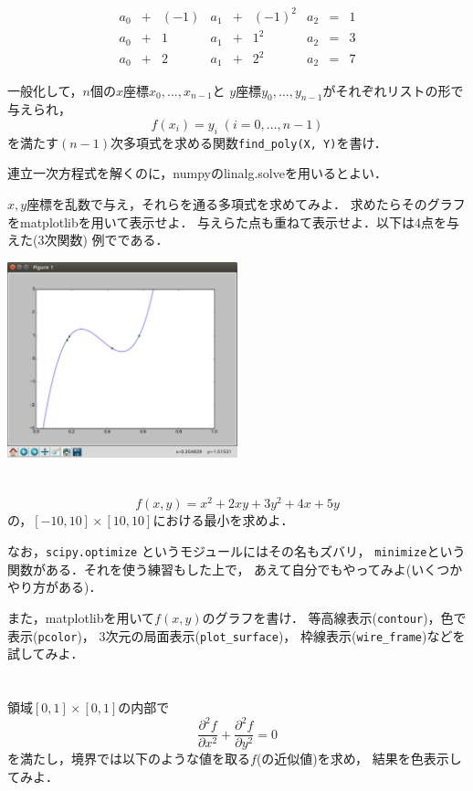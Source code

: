 \documentclass[12pt,dvipdfmx]{article}
\begin{document}
\[
\begin{array}{ccccccccc}
a_0 & + & (-1) & a_1 & + & (-1)^2 & a_2 & = & 1 \\
a_0 & + &   1  & a_1 & + & 1^2    & a_2 & = & 3 \\
a_0 & + &   2  & a_1 & + & 2^2    & a_2 & = & 7
\end{array}
\]

一般化して，$n$個の$x$座標$x_0, \ldots , x_{n-1}$と
$y$座標$y_0, \ldots , y_{n-1}$がそれぞれリストの形で与えられ，
\[ f(x_i) = y_i \; (i = 0, \ldots , n - 1) \]
を満たす$(n-1)$次多項式を求める関数{\tt find\_poly(X, Y)}を書け．

連立一次方程式を解くのに，numpyのlinalg.solveを用いるとよい．

$x, y$座標を乱数で与え，それらを通る多項式を求めてみよ．
求めたらそのグラフをmatplotlibを用いて表示せよ．
与えらた点も重ねて表示せよ．以下は4点を与えた(3次関数)
例でである．

\begin{center}
\includegraphics[width=0.5\textwidth]{out/pdf/img/poly.pdf}
\end{center}

\newpage
\fi



\section{}
\[ f(x,y) = x^2 + 2xy + 3y^2 + 4x + 5y \]
の，$[-10,10] \times [10,10]$における最小を求めよ．

なお，{\tt scipy.optimize} というモジュールにはその名もズバリ，
{\tt minimize}という関数がある．それを使う練習もした上で，
あえて自分でもやってみよ(いくつかやり方がある)．

また，matplotlibを用いて$f(x, y)$のグラフを書け．
等高線表示({\tt contour})，色で表示({\tt pcolor})，
3次元の局面表示({\tt plot\_surface})，
枠線表示({\tt wire\_frame})などを試してみよ．

\section{}
領域$[0,1] \times [0,1]$の内部で
\[ \frac{\partial^2 f}{\partial x^2} + \frac{\partial^2 f}{\partial y^2} = 0 \]
を満たし，境界では以下のような値を取る$f$(の近似値)を求め，
結果を色表示してみよ．
\end{document}

